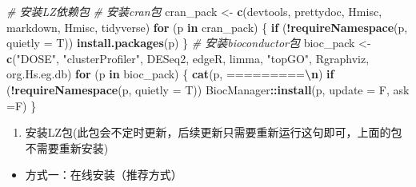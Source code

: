 \documentclass[
]{book}
\newenvironment{Shaded}{\begin{snugshade}}{\end{snugshade}}
\newcommand{\AttributeTok}[1]{\textcolor[rgb]{0.13,0.29,0.53}{#1}}
\newcommand{\CommentTok}[1]{\textcolor[rgb]{0.56,0.35,0.01}{\textit{#1}}}
\newcommand{\ControlFlowTok}[1]{\textcolor[rgb]{0.13,0.29,0.53}{\textbf{#1}}}
\newcommand{\FunctionTok}[1]{\textcolor[rgb]{0.13,0.29,0.53}{\textbf{#1}}}
\newcommand{\NormalTok}[1]{#1}
\newcommand{\OtherTok}[1]{\textcolor[rgb]{0.56,0.35,0.01}{#1}}
\newcommand{\SpecialCharTok}[1]{\textcolor[rgb]{0.81,0.36,0.00}{\textbf{#1}}}
\newcommand{\StringTok}[1]{\textcolor[rgb]{0.31,0.60,0.02}{#1}}
\providecommand{\tightlist}{%
  \setlength{\itemsep}{0pt}\setlength{\parskip}{0pt}}
\begin{document}
\begin{Shaded}
\begin{Highlighting}[]
\CommentTok{\# 安装LZ依赖包}
\CommentTok{\# 安装cran包}
\NormalTok{cran\_pack }\OtherTok{\textless{}{-}} \FunctionTok{c}\NormalTok{(}\StringTok{\textquotesingle{}devtools\textquotesingle{}}\NormalTok{, }\StringTok{\textquotesingle{}prettydoc\textquotesingle{}}\NormalTok{, }\StringTok{\textquotesingle{}Hmisc\textquotesingle{}}\NormalTok{, }\StringTok{\textquotesingle{}markdown\textquotesingle{}}\NormalTok{, }
               \StringTok{\textquotesingle{}Hmisc\textquotesingle{}}\NormalTok{, }\StringTok{\textquotesingle{}tidyverse\textquotesingle{}}\NormalTok{)}
\ControlFlowTok{for}\NormalTok{ (p }\ControlFlowTok{in}\NormalTok{ cran\_pack) \{ }
  \ControlFlowTok{if}\NormalTok{ (}\SpecialCharTok{!}\FunctionTok{requireNamespace}\NormalTok{(p, }\AttributeTok{quietly =}\NormalTok{ T)) }\FunctionTok{install.packages}\NormalTok{(p) }
\NormalTok{\}}
\CommentTok{\# 安装bioconductor包}
\NormalTok{bioc\_pack }\OtherTok{\textless{}{-}} \FunctionTok{c}\NormalTok{(}\StringTok{"DOSE"}\NormalTok{, }\StringTok{"clusterProfiler"}\NormalTok{, }\StringTok{\textquotesingle{}DESeq2\textquotesingle{}}\NormalTok{, }\StringTok{\textquotesingle{}edgeR\textquotesingle{}}\NormalTok{, }
               \StringTok{\textquotesingle{}limma\textquotesingle{}}\NormalTok{, }\StringTok{"topGO"}\NormalTok{, }\StringTok{\textquotesingle{}Rgraphviz\textquotesingle{}}\NormalTok{, }\StringTok{\textquotesingle{}org.Hs.eg.db\textquotesingle{}}\NormalTok{)}
\ControlFlowTok{for}\NormalTok{ (p }\ControlFlowTok{in}\NormalTok{ bioc\_pack) \{ }
  \FunctionTok{cat}\NormalTok{(p, }\StringTok{\textquotesingle{}=========}\SpecialCharTok{\textbackslash{}n}\StringTok{\textquotesingle{}}\NormalTok{) }
  \ControlFlowTok{if}\NormalTok{ (}\SpecialCharTok{!}\FunctionTok{requireNamespace}\NormalTok{(p, }\AttributeTok{quietly =}\NormalTok{ T)) }
\NormalTok{    BiocManager}\SpecialCharTok{::}\FunctionTok{install}\NormalTok{(p, }\AttributeTok{update =}\NormalTok{ F, }\AttributeTok{ask =}\NormalTok{F) }
\NormalTok{\}}
\end{Highlighting}
\end{Shaded}

\begin{enumerate}
\def\labelenumi{\arabic{enumi}.}
\setcounter{enumi}{1}
\tightlist
\item
  安装LZ包(此包会不定时更新，后续更新只需要重新运行这句即可，上面的包不需要重新安装)
\end{enumerate}

\begin{itemize}
\tightlist
\item
  方式一：在线安装（推荐方式）
\end{itemize}
\end{document}
